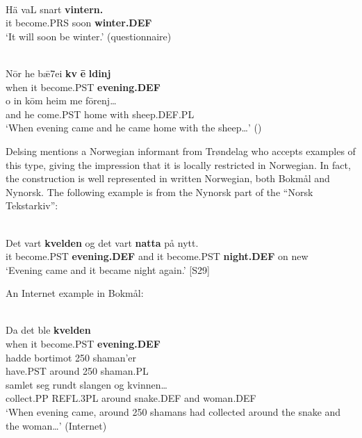 \ea \label{} 
\\
\gll Hä  vaL  snart  \textbf{vintern.}\\
it  become.PRS  soon  \textbf{winter.DEF}\\
\glt ‘It will soon be winter.’ (questionnaire)

\z

\ea \label{} 
\\
\gll N\=or  he  bǣ7ei  \textbf{kv} \textbf{\=e} \textbf{ldinj}\\
when  it  become.PST  \textbf{evening.DEF}\\
\gll o  in  k\=om  heim  me  f\=orenj…\\
and  he  come.PST  home  with  sheep.DEF.PL\\
\glt ‘When evening came and he came home with the sheep…’ (\citet[38]{Lundell1936})

\z

Delsing mentions a Norwegian informant from Trøndelag who accepts examples of this type, giving the impression that it is locally restricted in Norwegian. In fact, the construction is well represented in written Norwegian, both Bokmål and Nynorsk. The following example is from the Nynorsk part of the “Norsk Tekstarkiv”: 

\ea \label{} 
\\
\gll Det vart  \textbf{kvelden} og  det  vart  \textbf{natta} på  nytt.\\ %
it  become.PST  \textbf{evening.DEF} and  it  become.PST  \textbf{night.DEF} on  new\\
\glt ‘Evening came and it became night again.’ [S29]

\z

An Internet example in Bokmål: 


\ea \label{} 
\\
\gll Da  det  ble  \textbf{kvelden} \\
when  it  become.PST  \textbf{evening.DEF} \\
\gll hadde  bortimot  250  shaman’er\\
have.PST  around  250  shaman.PL\\
\gll samlet  seg  rundt  slangen  og  kvinnen…\\
collect.PP  REFL.3PL  around  snake.DEF  and  woman.DEF\\
\glt ‘When evening came, around 250 shamans had collected around the snake and the woman…’ (Internet)

